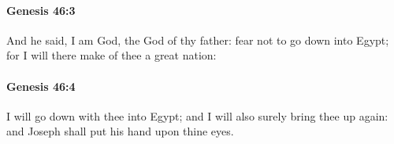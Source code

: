 		\paragraph{Genesis 46:3} %
			\label{GENESIS-46-3}

			And he said, I am God, the God of thy father: fear not to go down into Egypt; for I will there make of thee a great nation:


		\paragraph{Genesis 46:4} %
			\label{GENESIS-46-4}

			I will go down with thee into Egypt; and I will also surely bring thee up again: and Joseph shall put his hand upon thine eyes.


